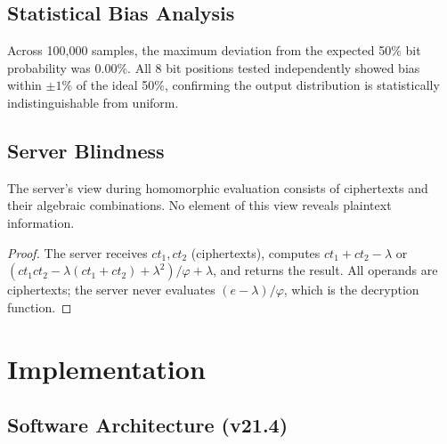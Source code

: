 \documentclass[11pt,a4paper]{article}
\begin{document}
\subsection{Statistical Bias Analysis}

Across 100,000 samples, the maximum deviation from the expected 50\% bit probability was 0.00\%. All 8 bit positions tested independently showed bias within $\pm 1\%$ of the ideal 50\%, confirming the output distribution is statistically indistinguishable from uniform.

\subsection{Server Blindness}

\begin{theorem}
The server's view during homomorphic evaluation consists of ciphertexts and their algebraic combinations. No element of this view reveals plaintext information.
\end{theorem}

\begin{proof}
The server receives $ct_1, ct_2$ (ciphertexts), computes $ct_1 + ct_2 - \lambda$ or $(ct_1 ct_2 - \lambda(ct_1 + ct_2) + \lambda^2)/\varphi + \lambda$, and returns the result. All operands are ciphertexts; the server never evaluates $(e - \lambda)/\varphi$, which is the decryption function.
\end{proof}

\section{Implementation}

\subsection{Software Architecture (v21.4)}
\end{document}
